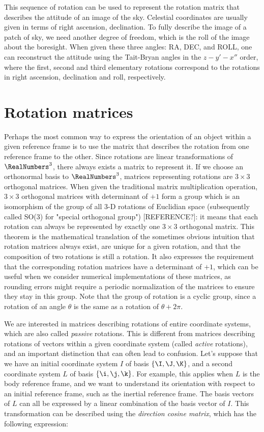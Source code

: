 This sequence of rotation can be used to represent the rotation matrix that describes the attitude of an image of the sky. Celestial coordinates are usually given in terms of right ascension, declination. To fully describe the image of a patch of sky, we need another degree of freedom, which is the roll of the image about the boresight. When given these three angles: RA, DEC, and ROLL, one can reconstruct the attitude using the Tait-Bryan angles in the $z-y'-x''$ order, where the first, second and third elementary rotations correspond to the rotations in right ascension, declination and roll, respectively.



\section{Rotation matrices}
\label{sec:rotationMatrices}
Perhaps the most common way to express the orientation of an object within a given reference frame is to use the matrix that describes the rotation from one reference frame to the other. Since rotations are linear transformations of $\RealNumbers^3$, there always exists a matrix to represent it. If we choose an orthonormal basis to $\RealNumbers^3$, matrices representing rotations are $3\times 3$ orthogonal matrices. When given the traditional matrix multiplication operation, $3\times 3$ orthogonal matrices with determinant of $+1$ form a group which is an isomorphism of the group of all 3-D rotations of Euclidian space (subsequently called SO(3) for "special orthogonal group") [REFERENCE?]: it means that each rotation can always be represented by exactly one $3\times 3$ orthogonal matrix. This theorem is the mathematical translation of the sometimes obvious intuition that rotation matrices always exist, are unique for a given rotation, and that the composition of two rotations is still a rotation. It also expresses the requirement that the corresponding rotation matrices have a determinant of $+1$, which can be useful when we consider numerical implementations of these matrices, as rounding errors might require a periodic normalization of the matrices to ensure they stay in this group. Note that the group of rotation is a cyclic group, since a rotation of an angle $\theta$ is the same as a rotation of $\theta+2\pi$.

We are interested in matrices describing rotations of entire coordinate systems, which are also called \textit{passive} rotations. This is different from matrices describing rotations of vectors within a given coordinate system (called \textit{active} rotations), and an important distinction that can often lead to confusion. Let's suppose that we have an initial coordinate system $I$ of basis $\{\I,\J,\K\}$, and a second coordinate system $L$ of basis $\{\i,\j,\k\}$. For example, this applies when $L$ is the body reference frame, and we want to understand its orientation with respect to an initial reference frame, such as the inertial reference frame. The basis vectors of $L$ can all be expressed by a linear combination of the basis vector of $I$. This transformation can be described using the \textit{direction cosine matrix}, which has the following expression:

